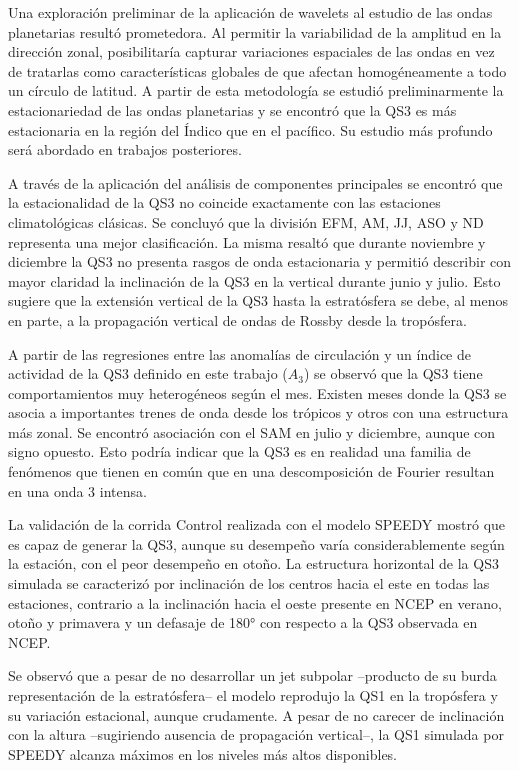 \documentclass[spanish,a4paper,12pt,oneside]{book}
\begin{document}
Una exploración preliminar de la aplicación de wavelets al estudio de
las ondas planetarias resultó prometedora. Al permitir la variabilidad
de la amplitud en la dirección zonal, posibilitaría capturar variaciones
espaciales de las ondas en vez de tratarlas como características
globales de que afectan homogéneamente a todo un círculo de latitud. A
partir de esta metodología se estudió preliminarmente la estacionariedad
de las ondas planetarias y se encontró que la QS3 es más estacionaria en
la región del Índico que en el pacífico. Su estudio más profundo será
abordado en trabajos posteriores.

A través de la aplicación del análisis de componentes principales se
encontró que la estacionalidad de la QS3 no coincide exactamente con las
estaciones climatológicas clásicas. Se concluyó que la división EFM, AM,
JJ, ASO y ND representa una mejor clasificación. La misma resaltó que
durante noviembre y diciembre la QS3 no presenta rasgos de onda
estacionaria y permitió describir con mayor claridad la inclinación de
la QS3 en la vertical durante junio y julio. Esto sugiere que la
extensión vertical de la QS3 hasta la estratósfera se debe, al menos en
parte, a la propagación vertical de ondas de Rossby desde la tropósfera.

A partir de las regresiones entre las anomalías de circulación y un
índice de actividad de la QS3 definido en este trabajo (\(A_3\)) se
observó que la QS3 tiene comportamientos muy heterogéneos según el mes.
Existen meses donde la QS3 se asocia a importantes trenes de onda desde
los trópicos y otros con una estructura más zonal. Se encontró
asociación con el SAM en julio y diciembre, aunque con signo opuesto.
Esto podría indicar que la QS3 es en realidad una familia de fenómenos
que tienen en común que en una descomposición de Fourier resultan en una
onda 3 intensa.

La validación de la corrida Control realizada con el modelo SPEEDY
mostró que es capaz de generar la QS3, aunque su desempeño varía
considerablemente según la estación, con el peor desempeño en otoño. La
estructura horizontal de la QS3 simulada se caracterizó por inclinación
de los centros hacia el este en todas las estaciones, contrario a la
inclinación hacia el oeste presente en NCEP en verano, otoño y primavera
y un defasaje de 180° con respecto a la QS3 observada en NCEP.

Se observó que a pesar de no desarrollar un jet subpolar --producto de
su burda representación de la estratósfera-- el modelo reprodujo la QS1
en la tropósfera y su variación estacional, aunque crudamente. A pesar
de no carecer de inclinación con la altura --sugiriendo ausencia de
propagación vertical--, la QS1 simulada por SPEEDY alcanza máximos en
los niveles más altos disponibles.
\end{document}
